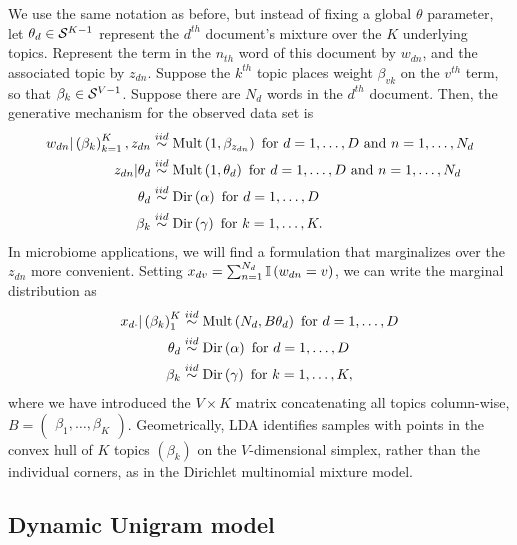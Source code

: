 \documentclass[oupdraft]{bio}
\begin{document}
We use the same notation as before, but instead of fixing a global $\theta$
parameter, let $\theta_{d} \in \mathcal{S}^{K - 1}$ represent the $d^{th}$
document's mixture over the $K$ underlying topics. Represent the term in the
$n_{th}$ word of this document by $w_{dn}$, and the associated topic by
$z_{dn}$. Suppose the $k^{th}$ topic places weight $\beta_{vk}$ on the $v^{th}$
term, so that $\beta_{k} \in \mathcal{S}^{V - 1}$. Suppose there are $N_{d}$ words
in the $d^{th}$ document. Then, the generative mechanism for the observed data
set is
\begin{align*}
w_{dn} \vert \left(\beta_{k}\right)_{k = 1}^{K}, z_{dn} &\overset{iid}{\sim} \textnormal{Mult}\left(1, \beta_{z_{dn}}\right) \text{ for } d = 1, \dots, D  \text{ and } n = 1, \dots,  N_{d} \\
z_{dn} \vert \theta_{d} &\overset{iid}{\sim} \textnormal{Mult}\left(1, \theta_{d}\right) \text{ for } d = 1, \dots, D \text{ and } n = 1, \dots, N_{d}\\
\theta_{d} &\overset{iid}{\sim} \textnormal{Dir}\left(\alpha\right) \text{ for } d = 1, \dots, D \\
\beta_{k} &\overset{iid}{\sim} \textnormal{Dir}\left(\gamma\right) \text{ for } k = 1, \dots, K.
\end{align*}
In microbiome applications, we will find a formulation that marginalizes over
the $z_{dn}$ more convenient. Setting $x_{dv} = \sum_{n = 1}^{N_{d}}
\mathbb{I}\left({w_{dn} = v}\right)$, we can write the marginal distribution as
\begin{align*}
x_{d\cdot} \vert \left(\beta_{k}\right)_{1}^{K} &\overset{iid}{\sim} \textnormal{Mult}\left(N_{d}, B\theta_{d}\right) \text{ for } d = 1, \dots, D\\
\theta_{d} &\overset{iid}{\sim} \textnormal{Dir}\left(\alpha\right) \text{ for } d = 1, \dots, D \\
\beta_{k} &\overset{iid}{\sim} \textnormal{Dir}\left(\gamma\right) \text{ for }k = 1, \dots, K,
\end{align*}
where we have introduced the $V \times K$ matrix concatenating all topics
column-wise, $B = \begin{pmatrix}\beta_{1}, \dots, \beta_{K}\end{pmatrix}$.
Geometrically, LDA identifies samples with points in the convex hull of $K$
topics $\left(\beta_{k}\right)$ on the $V$-dimensional simplex, rather than the
individual corners, as in the Dirichlet multinomial mixture model.

\subsection{Dynamic Unigram model}
\end{document}
